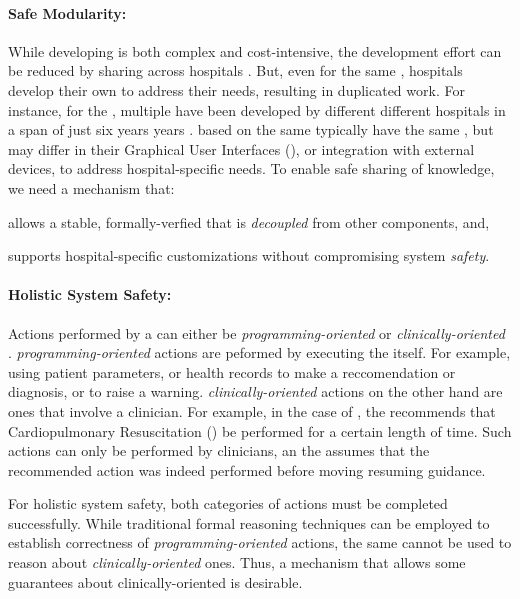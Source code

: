 \paragraph{Safe Modularity:}

While developing \CGSs{} is both complex and cost-intensive,
the development effort can be reduced by sharing \CGSs{} across hospitals \cite{PelegAMIA00}.
But, even for the same \BPG{}, hospitals develop their own \CGSs{} to address
their needs, resulting in duplicated work.
For instance, for the \ACLS{} \BPG{}, multiple \CGSs{} have been developed by different
different hospitals in a span of just six years years \cite{FullCodePro,PediAppRREST2020,
PediAppRREST2021,GuidingPad2017,GuidingPad2019, GuidingPad2020,DST2014,DST2019,ROSCo2021,TeamScreen2019,Wu2017}.
\CGSs{} based on the same \BPG{} typically have the same \CIG{}, but may differ
in their Graphical User Interfaces (\GUIs), or integration with external
devices, to address hospital-specific needs.
To enable safe sharing of knowledge, we need a mechanism that:
\begin{enumerate*}[label=(\alph*)]
  \item allows a stable, formally-verfied \CIG{} that is \emph{decoupled} from other
    components, and,
  \item supports hospital-specific customizations without compromising system
    \emph{safety}.
\end{enumerate*}

\paragraph{Holistic System Safety:}

Actions performed by a \CGS{} can either be \emph{programming-oriented}
or \emph{clinically-oriented} \cite{BoxwalaJBI04}. \emph{programming-oriented}
actions are peformed by executing the \CIG{} itself. For example,
using patient parameters, or health records to make a reccomendation or diagnosis,
or to raise a warning. \emph{clinically-oriented} actions on the other hand
are ones that involve a clinician. For example, in the case of \ACLS{},
the \CGS{} recommends that Cardiopulmonary Resuscitation (\CPR{}) be performed
for a certain length of time. Such actions can only be performed by clinicians,
an the \CGS{} assumes that the recommended action was indeed performed before
moving resuming guidance.

For holistic system safety, both categories of actions must be completed
successfully. While traditional formal reasoning techniques can be employed
to establish correctness of \emph{programming-oriented} actions, the same
cannot be used to reason about \emph{clinically-oriented} ones.
Thus, a mechanism that allows some guarantees about clinically-oriented is
desirable.


